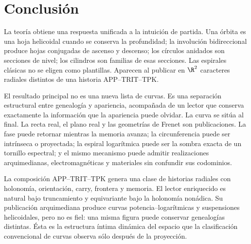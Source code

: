 \section{Conclusión}

La teoría obtiene una respuesta unificada a la intuición de partida. Una
órbita es una hoja helicoidal cuando se conserva la profundidad; la
involución bidireccional produce hojas conjugadas de ascenso y descenso; los
círculos anidados son secciones de nivel; los cilindros son familias de esas
secciones. Las espirales clásicas no se eligen como plantillas. Aparecen al
publicar en \(\R^2\) caracteres radiales distintos de una historia
APP--TRIT--TPK.

El resultado principal no es una nueva lista de curvas. Es una separación
estructural entre genealogía y apariencia, acompañada de un lector que
conserva exactamente la información que la apariencia puede olvidar. La
curva se sitúa al final. La recta real, el plano real y las geometrías de
Frenet son publicaciones. La fase puede retornar mientras la memoria avanza;
la circunferencia puede ser intrínseca o proyectada; la espiral logarítmica
puede ser la sombra exacta de un tornillo espectral; y el mismo mecanismo
puede admitir realizaciones arquimedianas, electromagnéticas y materiales sin
confundir sus codominios.

\begin{resultbox}[title={Clasificación functorial del lector radial y estratificación de sus realizaciones}]
La composición APP--TRIT--TPK genera una clase de historias radiales con
holonomía, orientación, carry, frontera y memoria. El lector enriquecido es
natural bajo truncamiento y equivariante bajo la holonomía nonádica. Su
publicación arquimediana produce curvas potencia--logarítmicas y suspensiones
helicoidales, pero no es fiel: una misma figura puede conservar genealogías
distintas. Ésta es la estructura íntima dinámica del espacio que la
clasificación convencional de curvas observa sólo después de la proyección.
\end{resultbox}
